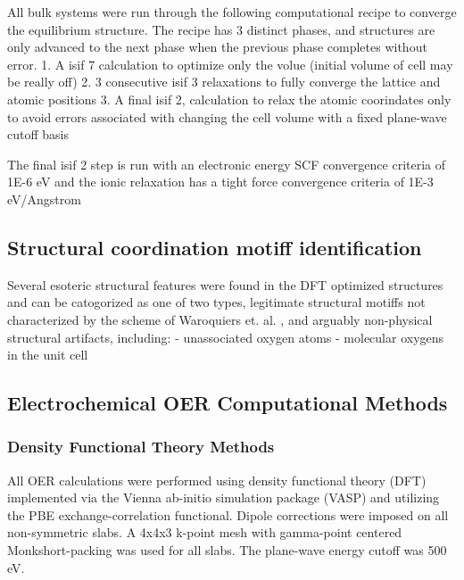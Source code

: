 All bulk systems were run through the following computational recipe to converge the equilibrium structure.
The recipe has 3 distinct phases, and structures are only advanced to the next phase when the previous phase completes without error.
1. A isif 7 calculation to optimize only the volue (initial volume of cell may be really off)
2. 3 consecutive isif 3 relaxations to fully converge the lattice and atomic positions
3. A final isif 2, calculation to relax the atomic coorindates only to avoid errors associated with changing the cell volume with a fixed plane-wave cutoff basis

The final isif 2 step is run with an electronic energy SCF convergence criteria of 1E-6 eV and the ionic relaxation has a tight force convergence criteria of 1E-3 eV/Angstrom

\subsection{Structural coordination motiff identification}
Several esoteric structural features were found in the DFT optimized structures and can be catogorized as one of two types, legitimate structural motiffs not characterized by the scheme of Waroquiers et. al. \cite{Waroquiers2017}, and arguably non-physical structural artifacts, including:
- unassociated oxygen atoms
- molecular oxygens in the unit cell
%

\subsection{Electrochemical OER Computational Methods}

\subsubsection{Density Functional Theory Methods}
All OER calculations were performed using density functional theory (DFT) implemented via the Vienna ab-initio simulation package (VASP) and utilizing the PBE exchange-correlation functional.
Dipole corrections were imposed on all non-symmetric slabs.
A 4x4x3 k-point mesh with gamma-point centered Monkshort-packing was used for all slabs.
The plane-wave energy cutoff was 500 eV.

